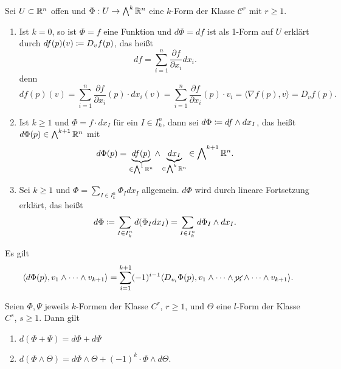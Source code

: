 \documentclass[a4paper,twoside,DIV15,BCOR12mm]{scrbook}
\newcommand{\bw}{\bigwedge\nolimits}
\begin{document}
\begin{definition}
Sei $U\subset \mathbb{R}^n$ offen und $\Phi: U\to\bw^k\MdR^n$ eine $k$-Form der Klasse $\mathcal C^r$ mit $r\ge 1$.
\begin{enumerate}[\quad(a)]
\item Ist $k=0$, so ist $\Phi = f$ eine Funktion und $d\Phi = df$ ist als 1-Form auf $U$ erklärt durch $df(p)(v) \da D_vf(p)$, das heißt
\[
df = \sum_{i=1}^n \frac{\partial f}{\partial x_i} dx_i.
\]
denn
\[
df(p)(v) = \sum_{i=1}^n \frac{\partial f}{\partial x_i}(p) \cdot dx_i(v) = \sum_{i=1}^n \frac{\partial f}{\partial x_i}(p) \cdot v_i = \langle \nabla f(p),v \rangle = D_vf(p).
\]
\item Ist $k\ge 1$ und $\Phi = f\cdot dx_I$ für ein $I\in I_k^n$, dann sei $d\Phi \da df\wedge dx_I$, das heißt $d\Phi(p) \in \bw^{k+1}\MdR^n$ mit
\[
d\Phi(p) = \underbrace{df(p)}_{\in\bw^1\MdR^n} \wedge \underbrace{dx_I}_{\in \bw^k\MdR^n} \in \bw^{k+1}\MdR^n.
\]
\item Sei $k\ge 1$ und $\Phi = \sum_{I\in I_k^n} \Phi_I dx_I$ allgemein. $d\Phi$ wird durch lineare Fortsetzung erklärt, das heißt
\[
d\Phi \da \sum_{I\in I_k^n} d(\Phi_I dx_I) = \sum_{I\in I_k^n} d\Phi_I \wedge dx_I.
\]
\end{enumerate}
\end{definition}

\begin{bemerkungen}
Es gilt
\[
\langle d\Phi(p), v_1\wedge \cdots \wedge v_{k+1}\rangle = \sum_{i=1}^{k+1} (-1)^{i-1} \langle D_{v_i} \Phi(p), v_1\wedge\cdots \wedge \cancel{v_{i}} \wedge \cdots \wedge v_{k+1}\rangle.
\]
\end{bemerkungen}

\pagebreak[2]
\begin{lemma}
\label{lem:4.1}
Seien $\Phi,\Psi$ jeweils $k$-Formen der Klasse $C^r$, $r\ge 1$, und $\Theta$ eine $l$-Form der Klasse $C^s$, $s\ge 1$. Dann gilt
\begin{enumerate}
\item $d(\Phi + \Psi) = d\Phi + d\Psi$
\item $d(\Phi \wedge \Theta) = d\Phi \wedge \Theta + (-1)^k\cdot \Phi \wedge d\Theta$.
\end{enumerate}
\end{lemma}
\end{document}
